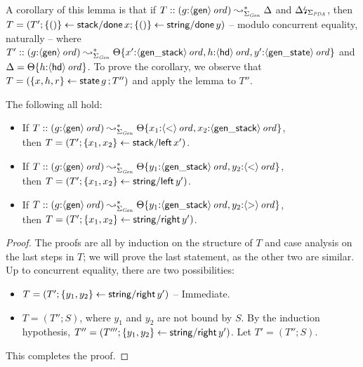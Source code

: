 A corollary of this lemma is that if 
$T :: (g{:}{\langle {\sf gen} \rangle}\,{{\it ord}}) \leadsto^*_{\Sigma_{\it Gen}} \Delta$ and
  ${\Delta}{\mbox{\lightning}}_{\Sigma_{\it PDA}}$, then $T = (T';
  \{{()}\} \leftarrow {{\sf stack/done}\,x}; \{{()}\} \leftarrow {{\sf
      string/done}\,y})$ -- modulo concurrent equality, naturally -- 
where $T' ::
  (g{:}{\langle {\sf gen} \rangle}\,{{\it ord}}) \leadsto^*_{\Sigma_{\it Gen}}
  {\Theta}\{{x'{:}{\langle {\sf gen\_stack} \rangle}\,{{\it ord}},
    h{:}{\langle {\sf hd} \rangle}\,{{\it ord}}, y'{:}{\langle {\sf gen\_state} \rangle}\,{{\it ord}}}\}$
  and $\Delta = {\Theta}\{{h{:}{\langle {\sf hd} \rangle}\,{{\it ord}}}\}$. To prove
the corollary, we observe
that $T = (\{{x,h,r}\} \leftarrow {{\sf state}\,g\,}; T'')$ and apply the lemma
to $T''$. 

\bigskip
\begin{lemma} The following all hold:
\begin{itemize}
\item If $T :: (g{:}{\langle {\sf gen} \rangle}\,{{\it ord}}) \leadsto^*_{\Sigma_{\it Gen}} 
       {\Theta}\{{x_1{:}{\langle {\sf <} \rangle}\,{{\it ord}}, 
          x_2{:}{\langle {\sf gen\_stack} \rangle}\,{{\it ord}}}\}$, \\then 
$T = (T'; \{{x_1,x_2}\} \leftarrow {{\sf stack/left}\,x'})$. 
\item If $T :: (g{:}{\langle {\sf gen} \rangle}\,{{\it ord}}) \leadsto^*_{\Sigma_{\it Gen}} 
       {\Theta}\{{y_1{:}{\langle {\sf gen\_stack} \rangle}\,{{\it ord}},
           y_2{:}{\langle {\sf <} \rangle}\,{{\it ord}}}\}$, \\then 
$T = (T'; \{{x_1,x_2}\} \leftarrow {{\sf string/left}\,y'})$. 
\item If $T :: (g{:}{\langle {\sf gen} \rangle}\,{{\it ord}}) \leadsto^*_{\Sigma_{\it Gen}} 
       {\Theta}\{{y_1{:}{\langle {\sf gen\_stack} \rangle}\,{{\it ord}},
           y_2{:}{\langle {\sf >} \rangle}\,{{\it ord}}}\}$, \\then 
$T = (T'; \{{x_1,x_2}\} \leftarrow {{\sf string/right}\,y'})$. 
\end{itemize}
\end{lemma}
\begin{proof}
The proofs are all by induction on the structure of $T$ and case
analysis on the last steps in $T$; we will prove the last statement, as
the other two are similar. Up to concurrent equality, there are two
possibilities:
\begin{itemize}
\item $T = (T'; \{{y_1, y_2}\} \leftarrow {{\sf string/right}\,y'})$ -- Immediate.
\item $T = (T''; S)$, where $y_1$ and $y_2$ are not bound by $S$. By the 
induction hypothesis, $T'' = (T'''; \{{y_1,y_2}\} \leftarrow {{\sf string/right}\,y'})$.
Let $T' = (T''; S)$. 
\end{itemize}
This completes the proof. 
\end{proof}

